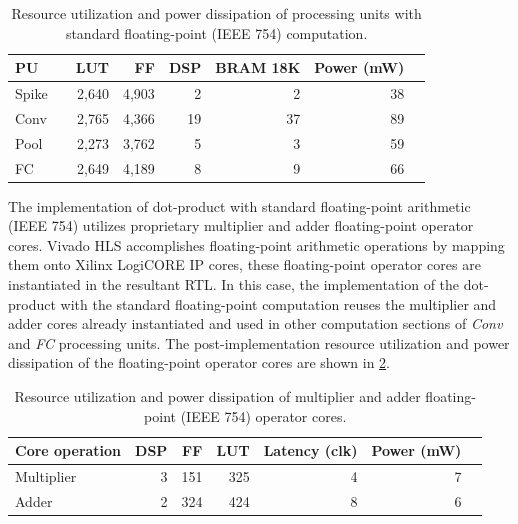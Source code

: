 \begin{table}[!h]\centering
	\caption{Resource utilization and power dissipation of processing units with standard floating-point (IEEE 754) computation.}\label{tab:resource_fp}
	\scriptsize
	\begin{tabular}{lrrrrrrr}\toprule
		\textbf{PU} & &\textbf{LUT} &\textbf{FF} &\textbf{DSP} &\textbf{BRAM 18K} &\textbf{Power (mW)} \\\midrule
		Spike & &2,640 &4,903 &2 &2 &38 \\
		Conv & &2,765 &4,366 &19 &37 &89 \\
		Pool & &2,273 &3,762 &5 &3 &59 \\
		FC & &2,649 &4,189 &8 &9 &66 \\
		\bottomrule
	\end{tabular}
\end{table}


The implementation of dot-product with standard floating-point arithmetic (IEEE 754) utilizes proprietary multiplier and adder floating-point operator cores. Vivado HLS accomplishes floating-point arithmetic operations by mapping them onto Xilinx LogiCORE IP cores, these floating-point operator cores are instantiated in the resultant RTL\cite{hrica2012floating}. In this case, the implementation of the dot-product with the standard floating-point computation reuses the multiplier and adder cores already instantiated and used in other computation sections of {\emph{Conv}} and {\emph{FC}} processing units. The post-implementation resource utilization and power dissipation of the floating-point operator cores are shown in {\ref{tab:LogiCORE}}.

\begin{table}[!h]\centering
	\caption{Resource utilization and power dissipation of multiplier and adder floating-point (IEEE 754) operator cores.}\label{tab:LogiCORE}
	\scriptsize
	\begin{tabular}{lrrrrrr}\toprule
		\textbf{Core operation} &\textbf{DSP} &\textbf{FF} &\textbf{LUT} &\textbf{Latency (clk)} &\textbf{Power (mW)} \\\midrule
		Multiplier &3 &151 &325 &4 &7 \\
		Adder &2 &324 &424 &8 &6 \\
		\bottomrule
	\end{tabular}
\end{table}

